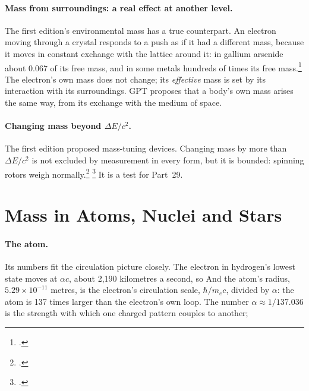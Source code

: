\documentclass[11pt,a4paper]{article}
\newcommand{\fn}[1]{\footnote{\citealp{#1}.}}
\begin{document}
\paragraph{Mass from surroundings: a real effect at another level.} The first edition's environmental mass has a true counterpart. An electron moving through a crystal responds to a push as if it had a different mass, because it moves in constant exchange with the lattice around it: in gallium arsenide about 0.067 of its free mass, and in some metals hundreds of times its free mass.\fn{stewart1984} The electron's own mass does not change; its \emph{effective} mass is set by its interaction with its surroundings.  GPT proposes that a body's own mass arises the same way, from its exchange with the medium of space.

\paragraph{Changing mass beyond $\Delta E/c^2$.} The first edition proposed mass-tuning devices. Changing mass by more than $\Delta E/c^2$ is not excluded by measurement in every form, but it is bounded: spinning rotors weigh normally.\fn{faller1990} \fn{calloni2014} It is a test for Part~29.

\section{Mass in Atoms, Nuclei and Stars}
\label{sec:binding}

\paragraph{The atom.}  Its numbers fit the circulation picture closely. The electron in hydrogen's lowest state moves at $\alpha c$, about 2,190 kilometres a second, so  And the atom's radius, $5.29\times10^{-11}$ metres, is the electron's circulation scale, $\hbar/m_e c$, divided by $\alpha$: the atom is 137 times larger than the electron's own loop. The number $\alpha \approx 1/137.036$ is the strength with which one charged pattern couples to another; 
\end{document}
